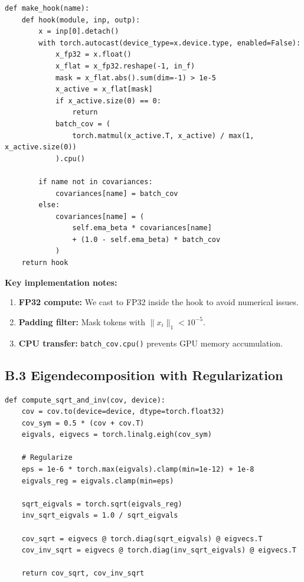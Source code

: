 \begin{lstlisting}
def make_hook(name):
    def hook(module, inp, outp):
        x = inp[0].detach()
        with torch.autocast(device_type=x.device.type, enabled=False):
            x_fp32 = x.float()
            x_flat = x_fp32.reshape(-1, in_f)
            mask = x_flat.abs().sum(dim=-1) > 1e-5
            x_active = x_flat[mask]
            if x_active.size(0) == 0:
                return
            batch_cov = (
                torch.matmul(x_active.T, x_active) / max(1, x_active.size(0))
            ).cpu()
        
        if name not in covariances:
            covariances[name] = batch_cov
        else:
            covariances[name] = (
                self.ema_beta * covariances[name]
                + (1.0 - self.ema_beta) * batch_cov
            )
    return hook
\end{lstlisting}

\textbf{Key implementation notes:}

\begin{enumerate}
\item \textbf{FP32 compute:} We cast to FP32 inside the hook to avoid numerical issues.
\item \textbf{Padding filter:} Mask tokens with $\|x_i\|_1 < 10^{-5}$.
\item \textbf{CPU transfer:} \texttt{batch\_cov.cpu()} prevents GPU memory accumulation.

\end{enumerate}
\subsection{B.3 Eigendecomposition with Regularization}

\begin{lstlisting}
def compute_sqrt_and_inv(cov, device):
    cov = cov.to(device=device, dtype=torch.float32)
    cov_sym = 0.5 * (cov + cov.T)
    eigvals, eigvecs = torch.linalg.eigh(cov_sym)
    
    # Regularize
    eps = 1e-6 * torch.max(eigvals).clamp(min=1e-12) + 1e-8
    eigvals_reg = eigvals.clamp(min=eps)
    
    sqrt_eigvals = torch.sqrt(eigvals_reg)
    inv_sqrt_eigvals = 1.0 / sqrt_eigvals
    
    cov_sqrt = eigvecs @ torch.diag(sqrt_eigvals) @ eigvecs.T
    cov_inv_sqrt = eigvecs @ torch.diag(inv_sqrt_eigvals) @ eigvecs.T
    
    return cov_sqrt, cov_inv_sqrt
\end{lstlisting}

